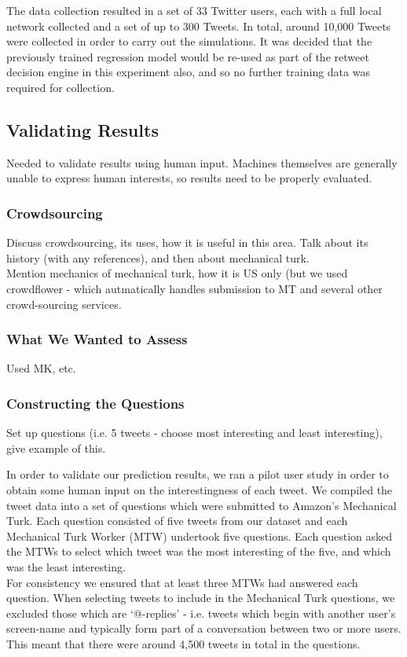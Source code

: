 The data collection resulted in a set of 33 Twitter users, each with a full local network collected and a set of up to 300 Tweets. In total, around 10,000 Tweets were collected in order to carry out the simulations. It was decided that the previously trained regression model would be re-used as part of the retweet decision engine in this experiment also, and so no further training data was required for collection.



\subsection{Validating Results}



Needed to validate results using human input. Machines themselves are generally unable to express human interests, so results need to be properly evaluated.

\subsubsection{Crowdsourcing}
Discuss crowdsourcing, its uses, how it is useful in this area. Talk about its history (with any references), and then about mechanical turk.
\\
Mention mechanics of mechanical turk, how it is US only (but we used crowdflower - which autmatically handles submission to MT and several other crowd-sourcing services.

\subsubsection{What We Wanted to Assess}
Used MK, etc.

\subsubsection{Constructing the Questions}
Set up questions (i.e. 5 tweets - choose most interesting and least interesting), give example of this.


In order to validate our prediction results, we ran a pilot user study in order to obtain some human input on the interestingness of each tweet. We compiled the tweet data into a set of questions which were submitted to Amazon's Mechanical Turk. Each question consisted of five tweets from our dataset and each Mechanical Turk Worker (MTW) undertook five questions. Each question asked the MTWs to select which tweet was the most interesting of the five, and which was the least interesting.
\\
For consistency we ensured that at least three MTWs had answered each question. When selecting tweets to include in the Mechanical Turk questions, we excluded those which are `@-replies' - i.e. tweets which begin with another user's screen-name and typically form part of a conversation between two or more users. This meant that there were around 4,500 tweets in total in the questions.

